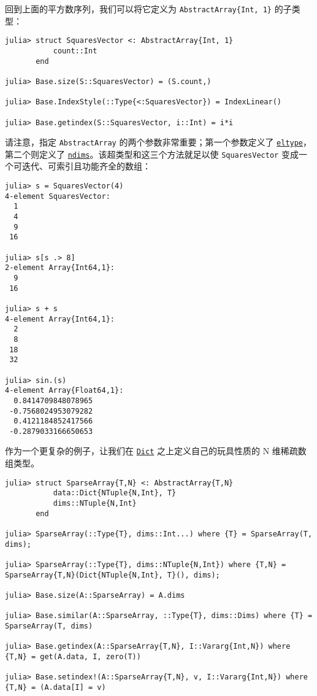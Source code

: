 回到上面的平方数序列，我们可以将它定义为 \texttt{AbstractArray\{Int, 1\}} 的子类型：




\begin{verbatim}
julia> struct SquaresVector <: AbstractArray{Int, 1}
           count::Int
       end

julia> Base.size(S::SquaresVector) = (S.count,)

julia> Base.IndexStyle(::Type{<:SquaresVector}) = IndexLinear()

julia> Base.getindex(S::SquaresVector, i::Int) = i*i
\end{verbatim}



请注意，指定 \texttt{AbstractArray} 的两个参数非常重要；第一个参数定义了 \hyperlink{6396209842929672718}{\texttt{eltype}}，第二个则定义了 \hyperlink{1688406579181746010}{\texttt{ndims}}。该超类型和这三个方法就足以使 \texttt{SquaresVector} 变成一个可迭代、可索引且功能齐全的数组：




\begin{verbatim}
julia> s = SquaresVector(4)
4-element SquaresVector:
  1
  4
  9
 16

julia> s[s .> 8]
2-element Array{Int64,1}:
  9
 16

julia> s + s
4-element Array{Int64,1}:
  2
  8
 18
 32

julia> sin.(s)
4-element Array{Float64,1}:
  0.8414709848078965
 -0.7568024953079282
  0.4121184852417566
 -0.2879033166650653
\end{verbatim}



作为一个更复杂的例子，让我们在 \hyperlink{3089397136845322041}{\texttt{Dict}} 之上定义自己的玩具性质的 N 维稀疏数组类型。




\begin{verbatim}
julia> struct SparseArray{T,N} <: AbstractArray{T,N}
           data::Dict{NTuple{N,Int}, T}
           dims::NTuple{N,Int}
       end

julia> SparseArray(::Type{T}, dims::Int...) where {T} = SparseArray(T, dims);

julia> SparseArray(::Type{T}, dims::NTuple{N,Int}) where {T,N} = SparseArray{T,N}(Dict{NTuple{N,Int}, T}(), dims);

julia> Base.size(A::SparseArray) = A.dims

julia> Base.similar(A::SparseArray, ::Type{T}, dims::Dims) where {T} = SparseArray(T, dims)

julia> Base.getindex(A::SparseArray{T,N}, I::Vararg{Int,N}) where {T,N} = get(A.data, I, zero(T))

julia> Base.setindex!(A::SparseArray{T,N}, v, I::Vararg{Int,N}) where {T,N} = (A.data[I] = v)
\end{verbatim}




